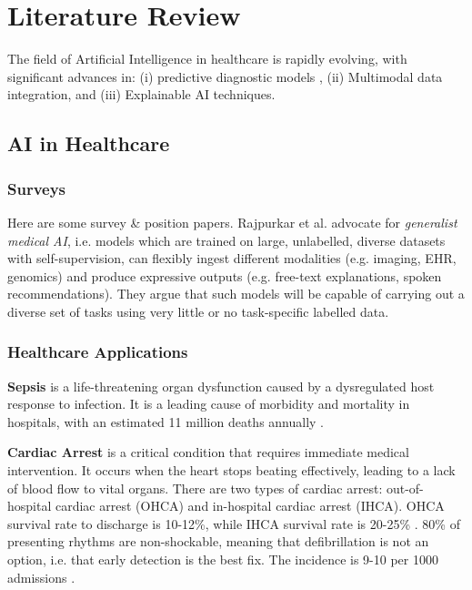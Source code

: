 \chapter{Literature Review}
The field of Artificial Intelligence in healthcare is rapidly evolving, with significant advances in: (i) predictive diagnostic models \cite{optimizing_ai_sepsis_2024}, (ii) Multimodal data integration, and (iii) Explainable AI techniques. 

\section{AI in Healthcare}

\subsection{Surveys}
Here are some survey \& position papers. Rajpurkar et al. \cite{moor2023GMAI} advocate for \textit{generalist medical AI}, i.e. models which are trained on large, unlabelled, diverse datasets with self-supervision, can flexibly ingest different modalities (e.g. imaging, EHR, genomics) and produce expressive outputs (e.g. free-text explanations, spoken recommendations). They argue that such models will be capable of carrying out a diverse set of tasks using very little or no task-specific labelled data.



\subsection{Healthcare Applications}
\textbf{Sepsis} \cite{singer2016sepsis3} is a life-threatening organ dysfunction caused by a dysregulated host response to infection. It is a leading cause of morbidity and mortality in hospitals, with an estimated 11 million deaths annually \cite{rudd2020global}. 

\textbf{Cardiac Arrest} is a critical condition that requires immediate medical intervention. It occurs when the heart stops beating effectively, leading to a lack of blood flow to vital organs.  There are two types of cardiac arrest: out-of-hospital cardiac arrest (OHCA) and in-hospital cardiac arrest (IHCA). OHCA survival rate to discharge is 10-12\%, while IHCA survival rate is 20-25\% \cite{andersen2019cardiac}. 80\% of presenting rhythms are non-shockable, meaning that defibrillation is not an option, i.e. that early detection is the best fix. The incidence is 9-10 per 1000 admissions \cite{andersen2019cardiac}.


